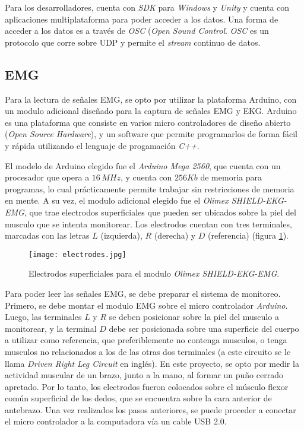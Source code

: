 Para los desarrolladores, cuenta con \emph{SDK} para \emph{Windows} y \emph{Unity} y cuenta con aplicaciones multiplataforma para poder acceder a los datos. Una forma de acceder a los datos es a través de \emph{OSC} (\emph{Open Sound Control}. \emph{OSC} es un protocolo que corre sobre UDP y permite el \emph{stream} continuo de datos.

\subsection{EMG} \label{emg-hardware}

Para la lectura de señales EMG, se opto por utilizar la plataforma Arduino, con un modulo adicional diseñado para la captura de señales EMG y EKG.  Arduino es una plataforma que consiste en varios micro controladores de diseño abierto (\emph{Open Source Hardware}), y un software que permite programarlos de forma fácil y rápida utilizando el lenguaje de progamación \emph{C++}.

El modelo de Arduino elegido fue el \emph{Arduino Mega 2560}, que cuenta con un procesador que opera a $16\, MHz$, y cuenta con $256 Kb$ de memoria para programas, lo cual prácticamente permite trabajar sin restricciones de memoria en mente. A su vez, el modulo adicional elegido fue el \emph{Olimex SHIELD-EKG-EMG}, que trae electrodos superficiales que pueden ser ubicados sobre la piel del musculo que se intenta monitorear.  Los electrodos cuentan con tres terminales, marcadas con las letras $L$ (izquierda), $R$ (derecha) y $D$ (referencia) (figura \ref{fig:emg-electrodes}).

\begin{figure}[H]
	\centering
    \texttt{[image: electrodes.jpg]}
    \caption{Electrodos superficiales para el modulo \emph{Olimex SHIELD-EKG-EMG}.}
	\label{fig:emg-electrodes}
\end{figure}

Para poder leer las señales EMG, se debe preparar el sistema de monitoreo.  Primero, se debe montar el modulo EMG sobre el micro controlador \emph{Arduino}.  Luego, las terminales $L$ y $R$ se deben posicionar sobre la piel del musculo a monitorear, y la terminal $D$ debe ser posicionada sobre una superficie del cuerpo a utilizar como referencia, que preferiblemente no contenga musculos, o tenga musculos no relacionados a los de las otras dos terminales (a este circuito se le llama \emph{Driven Right Leg Circuit} en inglés). En este proyecto, se opto por medir la actividad muscular de un brazo, junto a la mano, al formar un puño cerrado apretado. Por lo tanto, los electrodos fueron colocados sobre el músculo flexor común superficial de los dedos, que se encuentra sobre la cara anterior de antebrazo\cite{emg-signals-wrist}. Una vez realizados los pasos anteriores, se puede proceder a conectar el micro controlador a la computadora vía un cable USB 2.0.

